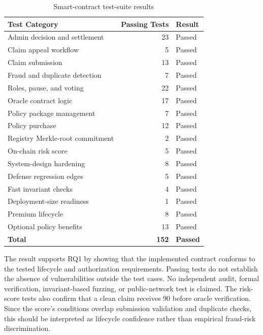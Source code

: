 \begin{table}[htbp]
\centering
\caption{Smart-contract test-suite results}
\label{tab:contract_tests}
\begin{tabular}{|p{8.0cm}|r|p{2.8cm}|}
\hline
\textbf{Test Category} & \textbf{Passing Tests} & \textbf{Result} \\
\hline
Admin decision and settlement & 23 & Passed \\
\hline
Claim appeal workflow & 5 & Passed \\
\hline
Claim submission & 13 & Passed \\
\hline
Fraud and duplicate detection & 7 & Passed \\
\hline
Roles, pause, and voting & 22 & Passed \\
\hline
Oracle contract logic & 17 & Passed \\
\hline
Policy package management & 7 & Passed \\
\hline
Policy purchase & 12 & Passed \\
\hline
Registry Merkle-root commitment & 2 & Passed \\
\hline
On-chain risk score & 5 & Passed \\
\hline
System-design hardening & 8 & Passed \\
\hline
Defense regression edges & 5 & Passed \\
\hline
Fast invariant checks & 4 & Passed \\
\hline
Deployment-size readiness & 1 & Passed \\
\hline
Premium lifecycle & 8 & Passed \\
\hline
Optional policy benefits & 13 & Passed \\
\hline
\textbf{Total} & \textbf{152} & \textbf{Passed} \\
\hline
\end{tabular}
\end{table}

The result supports RQ1 by showing that the implemented contract conforms to the
tested lifecycle and authorization requirements. Passing tests do not establish
the absence of vulnerabilities outside the test cases. No independent audit,
formal verification, invariant-based fuzzing, or public-network test is claimed.
The risk-score tests also confirm that a clean claim receives 90 before oracle
verification. Since the score's conditions overlap submission validation and
duplicate checks, this should be interpreted as lifecycle confidence rather
than empirical fraud-risk discrimination.

